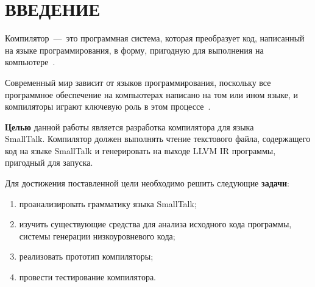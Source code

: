 \section*{ВВЕДЕНИЕ}
{}
 
Компилятор~---~это программная система, которая преобразует код, написанный на языке программирования, в форму, пригодную для выполнения на компьютере~\cite{aho2003}. 

Современный мир зависит от языков программирования, поскольку все программное обеспечение на компьютерах написано на том или ином языке, и компиляторы играют ключевую роль в этом процессе~\cite{aho2003}.

\textbf{Целью} данной работы является разработка компилятора для языка\\SmallTalk. Компилятор должен выполнять чтение текстового файла, содержащего код на языке SmallTalk и генерировать на выходе LLVM IR программы, пригодный для запуска.

Для достижения поставленной цели необходимо решить следующие \textbf{задачи}:
\begin{enumerate}
	\item проанализировать грамматику языка SmallTalk;
	\item изучить существующие средства для анализа исходного кода программы, системы генерации низкоуровневого кода;
	\item реализовать прототип компиляторы;
	\item провести тестирование компилятора.
\end{enumerate}


\newpage